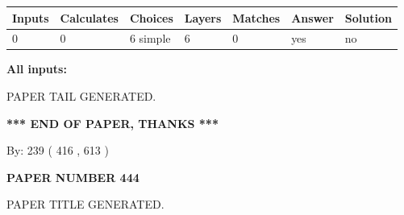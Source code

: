 \documentclass{ctexart}
\begin{document}
 
   
   
   
   
\noindent\begin{tabular}{|l|l|l|l|l|l|l|}
 \hline
Inputs & Calculates & Choices & Layers & Matches & Answer & Solution \\ \hline
 0  & 
 0  & 
 6
  simple  
  & 
 6  & 
 0  & 
  yes & 
  no 
  \\ \hline
 \end{tabular}
   
   
   
   
\noindent{}
   
   
   
   
\noindent\vspace{0.1in}\hspace{-0.08in} {\textbf{\Large{All inputs: }}}
   
   
   
   
   
   
 \vspace{0.2in}
 
   
   
\vspace{2.0in} PAPER TAIL GENERATED.
   
   
   
   
\vspace{1.0in} 
{\textbf{\large{ *** END OF PAPER, THANKS *** }}} 
   
   
\hspace{1.0in} By: 
 239 ( 416 ,  613 )
   
   
   
   
\newpage 
\setcounter{page}{ 
   444001 } 
   
   
   
   
 {\textbf{ \Large{ PAPER NUMBER  444  }}}
   
   
\vspace{0.2in}
   
   
   
   
   
   
   
   
 \vspace{0.2in}
 
 
 
 
   
   
 PAPER TITLE GENERATED.
   
\end{document}
